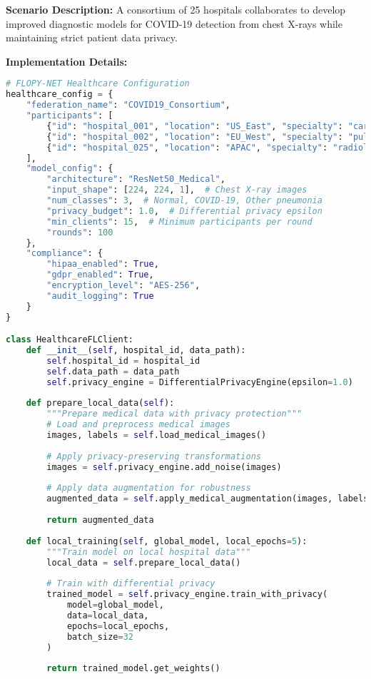 \textbf{Scenario Description:}
A consortium of 25 hospitals collaborates to develop improved diagnostic models for COVID-19 detection from chest X-rays while maintaining strict patient data privacy.

\textbf{Implementation Details:}
\begin{lstlisting}[language=python, caption=Healthcare FL Configuration]
# FLOPY-NET Healthcare Configuration
healthcare_config = {
    "federation_name": "COVID19_Consortium",
    "participants": [
        {"id": "hospital_001", "location": "US_East", "specialty": "cardiology"},
        {"id": "hospital_002", "location": "EU_West", "specialty": "pulmonology"},
        {"id": "hospital_025", "location": "APAC", "specialty": "radiology"}
    ],
    "model_config": {
        "architecture": "ResNet50_Medical",
        "input_shape": [224, 224, 1],  # Chest X-ray images
        "num_classes": 3,  # Normal, COVID-19, Other pneumonia
        "privacy_budget": 1.0,  # Differential privacy epsilon
        "min_clients": 15,  # Minimum participants per round
        "rounds": 100
    },
    "compliance": {
        "hipaa_enabled": True,
        "gdpr_enabled": True,
        "encryption_level": "AES-256",
        "audit_logging": True
    }
}

class HealthcareFLClient:
    def __init__(self, hospital_id, data_path):
        self.hospital_id = hospital_id
        self.data_path = data_path
        self.privacy_engine = DifferentialPrivacyEngine(epsilon=1.0)
        
    def prepare_local_data(self):
        """Prepare medical data with privacy protection"""
        # Load and preprocess medical images
        images, labels = self.load_medical_images()
        
        # Apply privacy-preserving transformations
        images = self.privacy_engine.add_noise(images)
        
        # Apply data augmentation for robustness
        augmented_data = self.apply_medical_augmentation(images, labels)
        
        return augmented_data
        
    def local_training(self, global_model, local_epochs=5):
        """Train model on local hospital data"""
        local_data = self.prepare_local_data()
        
        # Train with differential privacy
        trained_model = self.privacy_engine.train_with_privacy(
            model=global_model,
            data=local_data,
            epochs=local_epochs,
            batch_size=32
        )
        
        return trained_model.get_weights()
\end{lstlisting}

